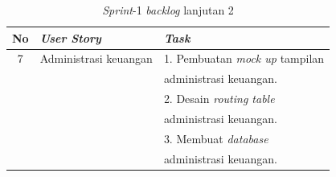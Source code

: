 \begin{table}[H]
	\centering
	\caption{\emph{Sprint}-1 \emph{backlog} lanjutan 2}
	\label{tabel_input}
	\begin{tabular}{|c|l|l|}
		\hline
		\textbf{No} & \textbf{\emph{User Story}} & \textbf{\emph{Task}} \\
		\hline
		
		7 &
		Administrasi keuangan & 
		1. Pembuatan \emph{mock up} tampilan\\
		
		& 
		& 
		administrasi keuangan.\\
		
		& 
		& 
		2. Desain \emph{routing table}\\
		
		& 
		& 
		administrasi keuangan.\\
		
		& 
		& 
		3. Membuat \emph{database}\\
		
		& 
		& 
		administrasi keuangan.\\
		\hline
		
	\end{tabular}
\end{table}

